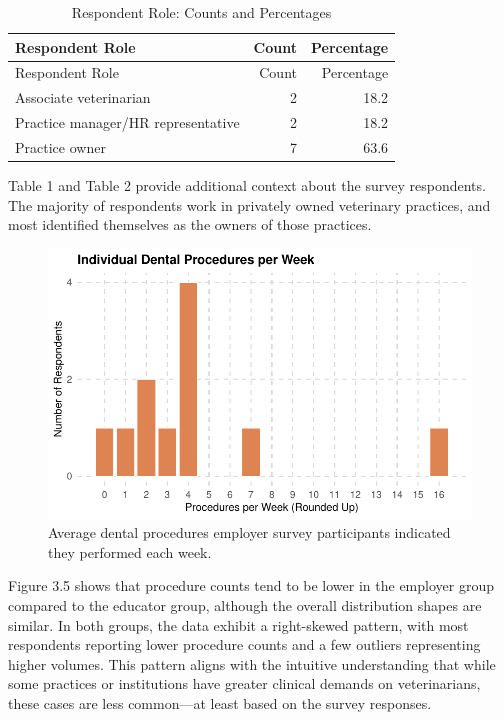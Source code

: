 \documentclass[
  11pt,
  letterpaper,
  DIV=11,
  numbers=noendperiod]{scrartcl}
\numberwithin{figure}{section}
\begin{document}
\begin{longtable}[]{@{}lrr@{}}
\caption{Respondent Role: Counts and Percentages}\tabularnewline
\toprule\noalign{}
Respondent Role & Count & Percentage \\
\midrule\noalign{}
\endfirsthead
\toprule\noalign{}
Respondent Role & Count & Percentage \\
\midrule\noalign{}
\endhead
\bottomrule\noalign{}
\endlastfoot
Associate veterinarian & 2 & 18.2 \\
Practice manager/HR representative & 2 & 18.2 \\
Practice owner & 7 & 63.6 \\
\end{longtable}

Table 1 and Table 2 provide additional context about the survey
respondents. The majority of respondents work in privately owned
veterinary practices, and most identified themselves as the owners of
those practices.

\begin{figure}[H]

{\centering \includegraphics{Final-Project_files/figure-pdf/Data_Desc_05-1.pdf}

}

\caption{Average dental procedures employer survey participants
indicated they performed each week.}

\end{figure}

Figure 3.5 shows that procedure counts tend to be lower in the employer
group compared to the educator group, although the overall distribution
shapes are similar. In both groups, the data exhibit a right-skewed
pattern, with most respondents reporting lower procedure counts and a
few outliers representing higher volumes. This pattern aligns with the
intuitive understanding that while some practices or institutions have
greater clinical demands on veterinarians, these cases are less
common---at least based on the survey responses.
\end{document}
